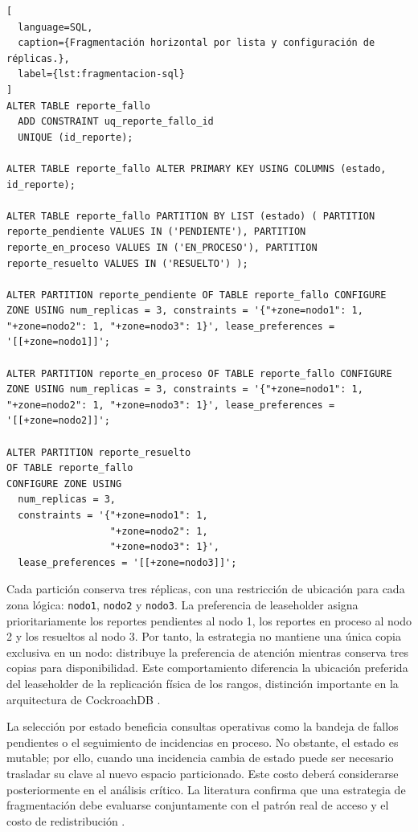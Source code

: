 \documentclass[12pt,a4paper]{article}
\begin{document}
\begin{lstlisting}[
  language=SQL,
  caption={Fragmentación horizontal por lista y configuración de réplicas.},
  label={lst:fragmentacion-sql}
]
ALTER TABLE reporte_fallo
  ADD CONSTRAINT uq_reporte_fallo_id
  UNIQUE (id_reporte);

ALTER TABLE reporte_fallo ALTER PRIMARY KEY USING COLUMNS (estado, id_reporte);

ALTER TABLE reporte_fallo PARTITION BY LIST (estado) ( PARTITION reporte_pendiente VALUES IN ('PENDIENTE'), PARTITION reporte_en_proceso VALUES IN ('EN_PROCESO'), PARTITION reporte_resuelto VALUES IN ('RESUELTO') );

ALTER PARTITION reporte_pendiente OF TABLE reporte_fallo CONFIGURE ZONE USING num_replicas = 3, constraints = '{"+zone=nodo1": 1, "+zone=nodo2": 1, "+zone=nodo3": 1}', lease_preferences = '[[+zone=nodo1]]';

ALTER PARTITION reporte_en_proceso OF TABLE reporte_fallo CONFIGURE ZONE USING num_replicas = 3, constraints = '{"+zone=nodo1": 1, "+zone=nodo2": 1, "+zone=nodo3": 1}', lease_preferences = '[[+zone=nodo2]]';

ALTER PARTITION reporte_resuelto
OF TABLE reporte_fallo
CONFIGURE ZONE USING
  num_replicas = 3,
  constraints = '{"+zone=nodo1": 1,
                  "+zone=nodo2": 1,
                  "+zone=nodo3": 1}',
  lease_preferences = '[[+zone=nodo3]]';
\end{lstlisting}

Cada partición conserva tres réplicas, con una restricción de ubicación para cada zona lógica: \texttt{nodo1}, \texttt{nodo2} y \texttt{nodo3}. La preferencia de leaseholder asigna prioritariamente los reportes pendientes al nodo 1, los reportes en proceso al nodo 2 y los resueltos al nodo 3. Por tanto, la estrategia no mantiene una única copia exclusiva en un nodo: distribuye la preferencia de atención mientras conserva tres copias para disponibilidad. Este comportamiento diferencia la ubicación preferida del leaseholder de la replicación física de los rangos, distinción importante en la arquitectura de CockroachDB \cite{taft2020cockroachdb,vanbenschoten2022multiregion}.

La selección por estado beneficia consultas operativas como la bandeja de fallos pendientes o el seguimiento de incidencias en proceso. No obstante, el estado es mutable; por ello, cuando una incidencia cambia de estado puede ser necesario trasladar su clave al nuevo espacio particionado. Este costo deberá considerarse posteriormente en el análisis crítico. La literatura confirma que una estrategia de fragmentación debe evaluarse conjuntamente con el patrón real de acceso y el costo de redistribución \cite{danach2024fragmentation,schafer2020benchmarking}.
\end{document}
